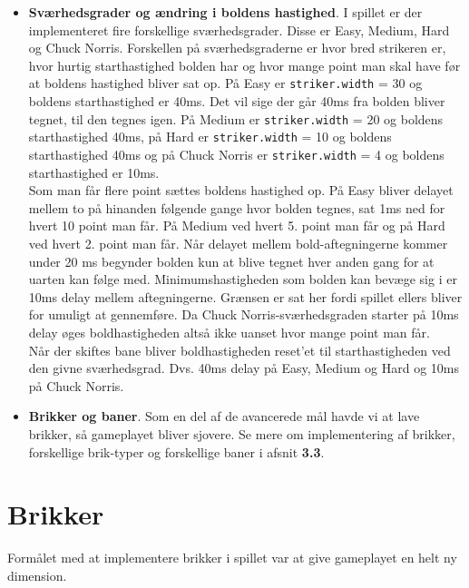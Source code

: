 \begin{itemize}
\item \textbf{Sværhedsgrader og ændring i boldens hastighed}. I spillet er der implementeret fire forskellige sværhedsgrader. Disse er Easy, Medium, Hard og Chuck Norris. Forskellen på sværhedsgraderne er hvor bred strikeren er, hvor hurtig starthastighed bolden har og hvor mange point man skal have før at boldens hastighed bliver sat op. På Easy er \texttt{striker.width} = 30 og boldens starthastighed er 40ms. Det vil sige der går 40ms fra bolden bliver tegnet, til den tegnes igen. På Medium er \texttt{striker.width} = 20 og boldens starthastighed 40ms, på Hard er \texttt{striker.width} = 10 og boldens starthastighed 40ms og på Chuck Norris er \texttt{striker.width} = 4 og boldens starthastighed er 10ms.\\

Som man får flere point sættes boldens hastighed op. På Easy bliver delayet mellem to på hinanden følgende gange hvor bolden tegnes, sat 1ms ned for hvert 10 point man får. På Medium ved hvert 5. point man får og på Hard ved hvert 2. point man får. Når delayet mellem bold-aftegningerne kommer under 20 ms begynder bolden kun at blive tegnet hver anden gang for at uarten kan følge med. Minimumshastigheden som bolden kan bevæge sig i er 10ms delay mellem aftegningerne. Grænsen er sat her fordi spillet ellers bliver for umuligt at gennemføre. Da Chuck Norris-sværhedsgraden starter på 10ms delay øges boldhastigheden altså ikke uanset hvor mange point man får.\\
Når der skiftes bane bliver boldhastigheden reset'et til starthastigheden ved den givne sværhedsgrad. Dvs. 40ms delay på Easy, Medium og Hard og 10ms på Chuck Norris.

\item \textbf{Brikker og baner}. Som en del af de avancerede mål havde vi at lave brikker, så gameplayet bliver sjovere. Se mere om implementering af brikker, forskellige brik-typer og forskellige baner i afsnit \textbf{3.3}.

\end{itemize}


\section{Brikker}

Formålet med at implementere brikker i spillet var at give gameplayet en helt ny dimension. 


